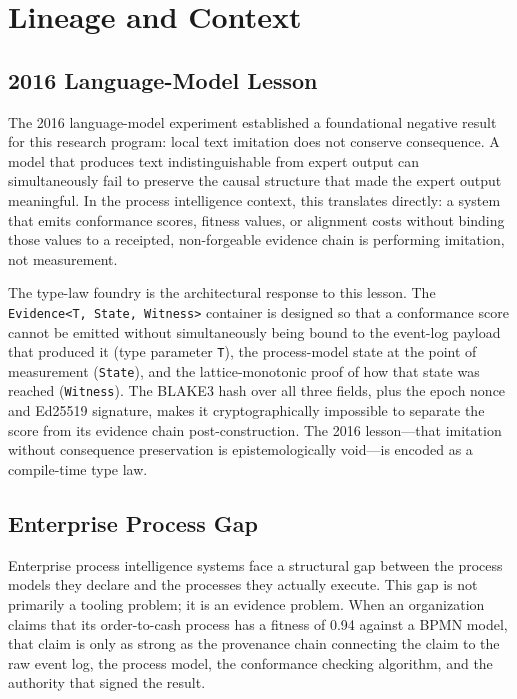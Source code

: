
\section{Lineage and Context}
\label{sec:sources-wasm4pm-compat-lineage}

\subsection{2016 Language-Model Lesson}
\label{sec:sources-wasm4pm-compat-lineage-2016}

The 2016 language-model experiment established a foundational negative result for this
research program: local text imitation does not conserve consequence. A model that
produces text indistinguishable from expert output can simultaneously fail to preserve
the causal structure that made the expert output meaningful. In the process intelligence
context, this translates directly: a system that emits conformance scores, fitness values,
or alignment costs without binding those values to a receipted, non-forgeable evidence
chain is performing imitation, not measurement.

The type-law foundry is the architectural response to this lesson. The
\texttt{Evidence<T, State, Witness>} container is designed so that a conformance score
cannot be emitted without simultaneously being bound to the event-log payload
that produced it (type parameter \texttt{T}), the process-model state at the point of
measurement (\texttt{State}), and the lattice-monotonic proof of how that state was reached
(\texttt{Witness}). The BLAKE3 hash over all three fields, plus the epoch nonce and
Ed25519 signature, makes it cryptographically impossible to separate the score from its
evidence chain post-construction. The 2016 lesson---that imitation without consequence
preservation is epistemologically void---is encoded as a compile-time type law.

\subsection{Enterprise Process Gap}
\label{sec:sources-wasm4pm-compat-lineage-enterprise}

Enterprise process intelligence systems face a structural gap between the process models
they declare and the processes they actually execute. This gap is not primarily a tooling
problem; it is an evidence problem. When an organization claims that its order-to-cash
process has a fitness of 0.94 against a BPMN model, that claim is only as strong as the
provenance chain connecting the claim to the raw event log, the process model, the
conformance checking algorithm, and the authority that signed the result.

